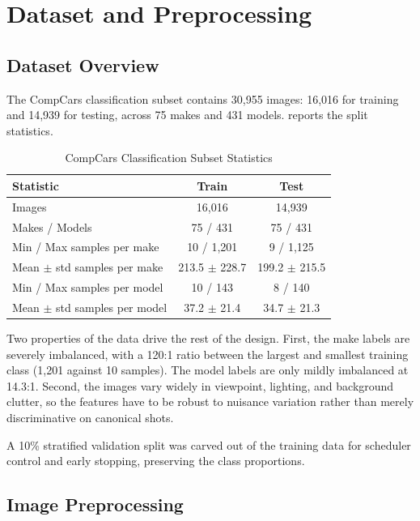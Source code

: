 
\section{Dataset and Preprocessing}
\label{sec:model}

\subsection{Dataset Overview}

The CompCars classification subset contains 30,955 images: 16,016 for training and 14,939 for testing, across 75 makes and 431 models.  reports the split statistics.

\begin{table}[ht]
\centering
\caption{CompCars Classification Subset Statistics}
\label{tab:dataset}
\small
\setlength{\tabcolsep}{4pt}
\begin{tabular}{lcc}
\toprule
\textbf{Statistic} & \textbf{Train} & \textbf{Test} \\
\midrule
Images & 16,016 & 14,939 \\
Makes / Models & 75 / 431 & 75 / 431 \\
Min / Max samples per make & 10 / 1,201 & 9 / 1,125 \\
Mean $\pm$ std samples per make & 213.5 $\pm$ 228.7 & 199.2 $\pm$ 215.5 \\
Min / Max samples per model & 10 / 143 & 8 / 140 \\
Mean $\pm$ std samples per model & 37.2 $\pm$ 21.4 & 34.7 $\pm$ 21.3 \\
\bottomrule
\end{tabular}
\end{table}

Two properties of the data drive the rest of the design. First, the make labels are severely imbalanced, with a 120:1 ratio between the largest and smallest training class (1,201 against 10 samples). The model labels are only mildly imbalanced at 14.3:1. Second, the images vary widely in viewpoint, lighting, and background clutter, so the features have to be robust to nuisance variation rather than merely discriminative on canonical shots.

A 10\% stratified validation split was carved out of the training data for scheduler control and early stopping, preserving the class proportions.

\subsection{Image Preprocessing}

